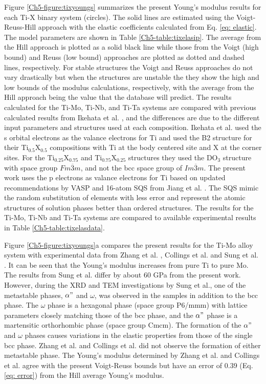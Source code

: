 Figure \ref{Ch5-figure:tixyoungs} summarizes the present Young's modulus results for each Ti-X binary system (circles). The solid lines are estimated using the Voigt-Reuss-Hill approach with the elastic coefficients calculated from Eq. \ref{eq: elastic}. The model parameters are shown in Table \ref{Ch5-table:tixelasip}. The average from the Hill approach is plotted as a solid black line while those from the Voigt (high bound) and Reuss (low bound) approaches are plotted as dotted and dashed lines, respectively. For stable structures the Voigt and Reuss approaches do not vary drastically but when the structures are unstable the they show the high and low bounds of the modulus calculations, respectively, with the average from the Hill approach being the value that the database will predict. The results calculated for the Ti-Mo, Ti-Nb, and Ti-Ta systems are compared with previous calculated results from Ikehata et al. \cite{Ikehata2004}, and the differences are due to the different input parameters and structures used at each composition. Ikehata et al. used the s orbital electrons as the valance electrons for Ti and used the B2 structure for their Ti$_{0.5}$X$_{0.5}$ compositions with Ti at the body centered site and X at the corner sites. For the Ti$_{0.25}$X$_{0.75}$ and Ti$_{0.75}$X$_{0.25}$ structures they used the DO$_{3}$ structure with space group $Fm\overline{3}m$, and not the bcc space group of $Im\overline{3}m$. The present work uses the p electrons as valance electrons for Ti based on updated recommendations by VASP and 16-atom SQS from Jiang et al. \cite{Jiang2004}. The SQS mimic the random substitution of elements with less error and represent the atomic structures of solution phases better than ordered structures. The results for the Ti-Mo, Ti-Nb and Ti-Ta systems are compared to available experimental results \cite{Zhang2015,Boyer1994,Sung2015,Ozaki2004,Fedotov1985,Zhou2009a,Zhou2004a} in Table \ref{Ch5-table:tixelasdata}. 

Figure \ref{Ch5-figure:tixyoungs}a compares the present results for the Ti-Mo alloy system with experimental data from Zhang et al. \cite{Zhang2015}, Collings et al. \cite{Boyer1994} and Sung et al. \cite{Sung2015}. It can be seen that the Young's modulus increases from pure Ti to pure Mo. The results from Sung et al. \cite{Sung2015} differ by about 60 GPa from the present work. However, during the XRD and TEM investigations by Sung et al., one of the metastable phases, $\alpha"$ and $\omega$, was observed in the samples in addition to the bcc phase. The $\omega$ phase is a hexagonal phase (space group P6/mmm) with lattice parameters closely matching those of the bcc phase, and the $\alpha"$ phase is a martensitic orthorhombic phase (space group Cmcm). The formation of the $\alpha"$ and $\omega$ phases causes variations in the elastic properties from those of the single bcc phase. Zhang et al. \cite{Zhang2015} and Collings et al. \cite{Boyer1994} did not observe the formation of either metastable phase. The Young's modulus determined by Zhang et al. and Collings et al. agree with the present Voigt-Reuss bounds but have an error of 0.39 (Eq. \ref{eq: error}) from the Hill average Young's modulus. 

